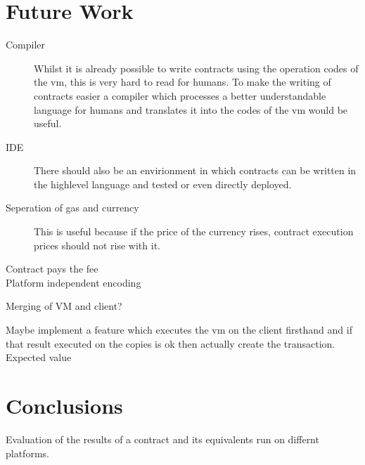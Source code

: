 \section{Future Work}

\begin{description}
  \item[Compiler]  Whilst it is already possible to write contracts using the operation codes of the vm, this is very hard to read for humans. To make the writing of contracts easier a compiler which processes a better understandable language for humans and translates it into the codes of the vm would be useful. 
  \item[IDE] There should also be an envirionment in which contracts can be written in the highlevel language and tested or even directly deployed.
  \item[Seperation of gas and currency] This is useful because if the price of the currency rises, contract execution prices should not rise with it.
  \item[Contract pays the fee]
  \item[Platform independent encoding]
\end{description}


Merging of VM and client?


Maybe implement a feature which executes the vm on the client firsthand and if that result executed on the copies is ok then actually create the transaction. Expected value


\section{Conclusions}
Evaluation of the results of a contract and its equivalents run on differnt platforms.